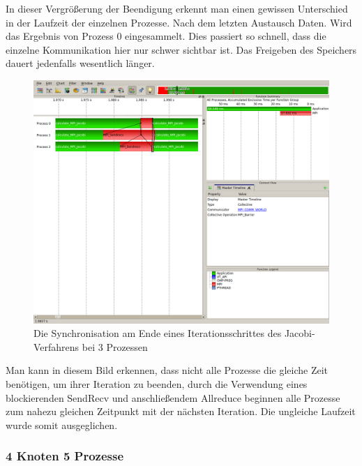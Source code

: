 \documentclass[a4paper,12pt]{scrartcl}
\begin{document}
In dieser Vergrößerung der Beendigung erkennt man einen gewissen Unterschied in der Laufzeit der einzelnen Prozesse. Nach dem letzten Austausch Daten. Wird das Ergebnis von Prozess 0 eingesammelt. Dies passiert so schnell, dass die einzelne Kommunikation hier nur schwer sichtbar ist. Das Freigeben des Speichers dauert jedenfalls wesentlich länger.
\FloatBarrier
\begin{figure}[hr!]
 \includegraphics[scale=0.45]{./3_2_JA/Syncronize.png}
 \caption{Die Synchronisation am Ende eines Iterationsschrittes des Jacobi-Verfahrens bei 3 Prozessen}
\end{figure}
Man kann in diesem Bild erkennen, dass nicht alle Prozesse die gleiche Zeit benötigen, um ihrer Iteration zu beenden, durch die Verwendung eines blockierenden SendRecv und anschließendem Allreduce beginnen alle Prozesse zum nahezu gleichen Zeitpunkt mit der nächsten Iteration. Die ungleiche Laufzeit wurde somit ausgeglichen.
\FloatBarrier
\FloatBarrier
\subsubsection{4 Knoten 5 Prozesse}
\end{document}
